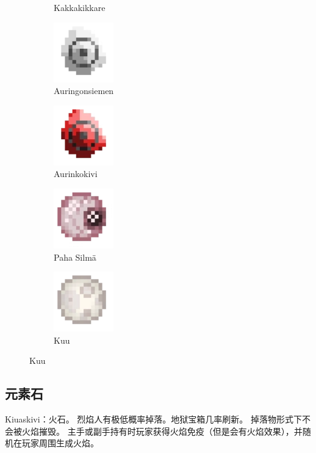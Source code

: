 \documentclass[11pt]{article}
\begin{document}
\begin{figure}[ht]
\begin{subfigure}{7em}
            \caption{Kakkakikkare}
        \end{subfigure}
        \begin{subfigure}{7em}
            \centering
            \includegraphics[width=7em]{./imgs/Item_sunseed}
            \caption{Auringonsiemen}
        \end{subfigure}
        \begin{subfigure}{7em}
            \centering
            \includegraphics[width=7em]{./imgs/Item_sunseed_2}
            \caption{Aurinkokivi}
        \end{subfigure}
        \begin{subfigure}{7em}
            \centering
            \includegraphics[width=7em]{./imgs/Item_evil_eye}
            \caption{Paha Silmä}
        \end{subfigure}
        \begin{subfigure}{7em}
            \centering
            \includegraphics[width=7em]{./imgs/Item_moon}
            \caption{Kuu}
        \end{subfigure}\label{fig:items}
    \end{figure}

    \subsection{元素石}\label{subsec:element-stone}
    Kiuaskivi：火石。
    烈焰人有极低概率掉落。地狱宝箱几率刷新。
    掉落物形式下不会被火焰摧毁。
    主手或副手持有时玩家获得火焰免疫（但是会有火焰效果），并随机在玩家周围生成火焰。
\end{document}
